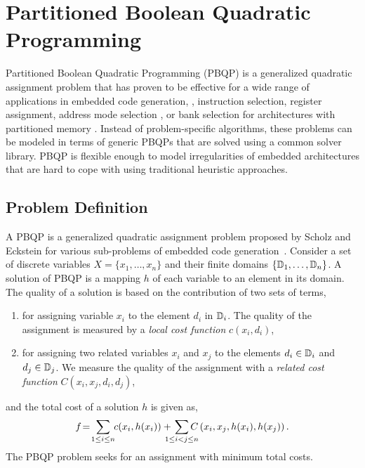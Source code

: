 \section{Partitioned Boolean Quadratic Programming}
Partitioned Boolean Quadratic Programming
(PBQP) is a generalized quadratic assignment problem that has proven
to be effective for a wide range of applications in embedded code
generation, \eg, instruction selection, register assignment, address
mode selection \cite{Eck03}, or bank selection for architectures with
partitioned memory \cite{journals/tecs/ScholzBX08}. Instead of
problem-specific algorithms, these problems can be modeled in terms of
generic {PBQP}s that are solved using a common solver library. PBQP
is flexible enough to model irregularities of embedded architectures
that are hard to cope with using traditional heuristic approaches.

\subsection{Problem Definition}
A PBQP is a generalized quadratic assignment problem proposed by
Scholz and Eckstein for various sub-problems of embedded code
generation~\cite{ScholzE02,Eck03}. Consider a set of discrete
variables $X=\{x_1,\ldots,x_n\}$ and their finite domains
$\{\mathbb D_1,\ldots,\mathbb D_n\}$. A solution of PBQP is a
mapping $h$ of each variable to an element in its domain. The quality of a
solution is based on the contribution of two sets of terms,
\begin{enumerate}
\item for assigning variable $x_i$ to the element $d_i$ in
  $\mathbb D_i$. The quality of the assignment is measured by a
  \emph{local cost function} $c(x_i, d_i)$,
\item for assigning two related variables $x_i$ and $x_j$ to the
  elements $d_i \in \mathbb D_i$ and $d_j \in \mathbb D_j$.  We
  measure the quality of the assignment with a \emph{related cost
    function\/} $C(x_i,x_j, d_i,d_j)$,
\end{enumerate}
and the total cost of a solution $h$ is given as,
\begin{equation}
  f\! =\! \sum_{1 \leq i \leq n} \hspace{-1mm} c(x_i,h(x_i)) + \hspace{-3mm} \sum_{1 \leq i < j  \leq n} \hspace{-3.5mm}
  C\left (x_i,x_j, h(x_i), h(x_j) \right). \label{eqn-pbqp}
\end{equation}
The PBQP problem seeks for an assignment with minimum total costs.

